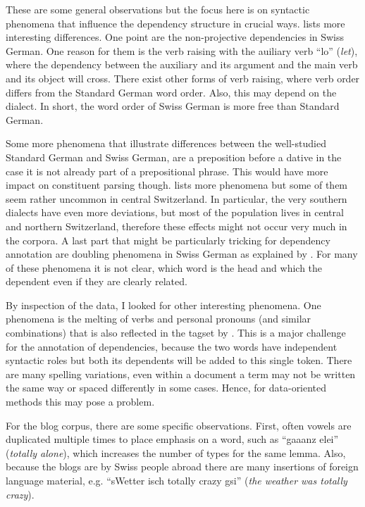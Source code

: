\documentclass[11pt,letterpaper, covington]{article}
\begin{document}
These are some general observations but the focus here is on syntactic phenomena that influence the dependency structure in crucial ways. \citet{Scherrer11} lists more interesting differences. One point are the non-projective dependencies in Swiss German. One reason for them is the verb raising with the auiliary verb ``lo'' (\emph{let}), where the dependency between the auxiliary and its argument and the main verb and its object will cross. There exist other forms of verb raising, where verb order differs from the Standard German word order. Also, this may depend on the dialect. In short, the word order of Swiss German is more free than Standard German. 

Some more phenomena that illustrate differences between the well-studied Standard German and Swiss German, are a preposition before a dative in the case it is not already part of a prepositional phrase. This would have more impact on constituent parsing though. \citet{Scherrer11} lists more phenomena but some of them seem rather uncommon in central Switzerland. In particular, the very southern dialects have even more deviations, but most of the population lives in central and northern Switzerland, therefore these effects might not occur very much in the corpora. A last part that might be particularly tricking for dependency annotation are doubling phenomena in Swiss German as explained by \citet{GF06}. For many of these phenomena it is not clear, which word is the head and which the dependent even if they are clearly related.

By inspection of the data, I looked for other interesting phenomena. One phenomena is the melting of verbs and personal pronouns (and similar combinations) that is also reflected in the tagset by \citet{AH12}. This is a major challenge for the annotation of dependencies, because the two words have independent syntactic roles but both its dependents will be added to this single token. There are many spelling variations, even within a document a term may not be written the same way or spaced differently in some cases. Hence, for data-oriented methods this may pose a problem. 

For the blog corpus, there are some specific observations. First, often vowels are duplicated multiple times to place emphasis on a word, such as ``gaaanz elei'' (\emph{totally alone}), which increases the number of types for the same lemma. Also, because the blogs are by Swiss people abroad there are many insertions of foreign language material, e.g. ``sWetter isch totally crazy gsi'' (\emph{the weather was totally crazy}).
\end{document}
